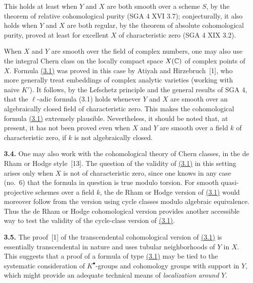 This holds at least when $Y$ and $X$ are both smooth over a scheme $S$, by the
theorem of relative cohomological purity (SGA 4 XVI 3.7); conjecturally, it
also holds when $Y$ and $X$ are both regular, by the theorem of absolute
cohomological purity, proved at least for excellent $X$ of characteristic
zero (SGA 4 XIX 3.2).

When $X$ and $Y$ are smooth over the field of complex numbers, one may also
use the integral Chern class on the locally compact space $X(\mathbb C)$ of complex
points of $X$. Formula \hyperlink{sga6.e14.eq.3-1}{(3.1)} was proved in this case by Atiyah and
Hirzebruch~[1], who more generally treat embeddings of complex analytic
varieties (working with naive $K'$). It follows, by the Lefschetz principle
and the general results of SGA 4, that the $\ell$-adic formula (3.1) holds
whenever $Y$ and $X$ are smooth over an algebraically closed field of
characteristic zero. This makes the cohomological formula \hyperlink{sga6.e14.eq.3-1}{(3.1)} extremely
plausible. Nevertheless, it should be noted that, at present, it has not been
proved even when $X$ and $Y$ are smooth over a field $k$ of characteristic
zero, if $k$ is not algebraically closed.

\noindent{}\textbf{3.4.}
One may also work with the cohomological theory of Chern classes, in the de
Rham or Hodge style~[13]. The question of the validity of \hyperlink{sga6.e14.eq.3-1}{(3.1)} in this
setting arises only when $X$ is not of characteristic zero, since one knows
in any case (no.~6) that the formula in question is true modulo torsion. For
smooth quasi-projective schemes over a field $k$, the de Rham or Hodge
version of \hyperlink{sga6.e14.eq.3-1}{(3.1)} would moreover follow from the version using cycle classes
modulo algebraic equivalence. Thus the de Rham or Hodge cohomological version
provides another accessible way to test the validity of the cycle-class
version of \hyperlink{sga6.e14.eq.3-1}{(3.1)}.

\noindent{}\textbf{3.5.}
The proof~[1] of the transcendental cohomological version of \hyperlink{sga6.e14.eq.3-1}{(3.1)} is
essentially transcendental in nature and uses tubular neighborhoods of $Y$
in $X$. This suggests that a proof of a formula of type \hyperlink{sga6.e14.eq.3-1}{(3.1)} may be tied to
the systematic consideration of $K^\bullet$-groups and cohomology groups with
support in $Y$, which might provide an adequate technical means of
\emph{localization around $Y$}.

